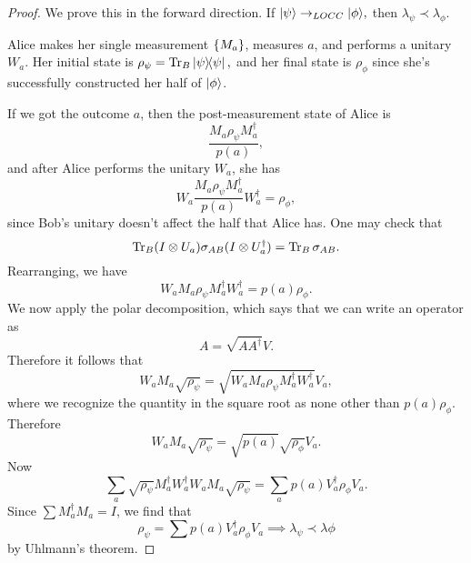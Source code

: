 \begin{proof}
    We prove this in the forward direction. If $\lvert\psi\rangle\to_{LOCC} \lvert\phi\rangle,$ then $\lambda_\psi \prec \lambda_\phi$.
    
    Alice makes her single measurement $\{M_a\}$, measures $a$, and performs a unitary $W_a$. Her initial state is $\rho_\psi=\operatorname{Tr}_B \left\lvert{\psi}\middle\rangle\!\middle\langle{\psi}\right\rvert,$ and her final state is $\rho_{\phi}$ since she's successfully constructed her half of $\lvert\phi\rangle$.
    
    If we got the outcome $a$, then the post-measurement state of Alice is
    \begin{equation}
        \frac{M_a\rho_\psi M_a^\dagger}{p(a)},
    \end{equation}
    and after Alice performs the unitary $W_a$, she has
    \begin{equation}
        W_a \frac{M_a\rho_\psi M_a^\dagger}{p(a)} W_a^\dagger = \rho_\phi,
    \end{equation}
    since Bob's unitary doesn't affect the half that Alice has. One may check that
    \begin{equation}
        \operatorname{Tr}_B(I\otimes U_a) \sigma_{AB}(I\otimes U_a^\dagger) =\operatorname{Tr}_B \sigma_{AB}.
    \end{equation}
    Rearranging, we have
    \begin{equation}
        W_a M_a \rho_\psi M_a^\dagger W_a^\dagger = p(a) \rho_\phi.
    \end{equation}
    We now apply the polar decomposition, which says that we can write an operator as
    \begin{equation}
        A=\sqrt{AA^\dagger}V.
    \end{equation}
    Therefore it follows that
    \begin{equation}
        W_a M_a \sqrt{\rho_\psi}=\sqrt{W_a M_a \rho_\psi M_a^\dagger W_a^\dagger} V_a,
    \end{equation}
    where we recognize the quantity in the square root as none other than $p(a)\rho_\phi$. Therefore
    \begin{equation}
        W_a M_a \sqrt{\rho_\psi}=\sqrt{p(a)}\sqrt{\rho_\phi}V_a.
    \end{equation}
    Now
    \begin{equation}
         \sum_a \sqrt{\rho_\psi} M_a^\dagger W_a^\dagger W_a M_a \sqrt{\rho_\psi} = \sum_a p(a) V_a^\dagger \rho_\phi V_a.
    \end{equation}
    Since $\sum M_a^\dagger M_a = I$, we find that
    \begin{equation}
        \rho_\psi = \sum p(a) V_a^\dagger \rho_\phi V_a \implies \lambda_\psi \prec \lambda\phi
    \end{equation}
    by Uhlmann's theorem.
\end{proof}

